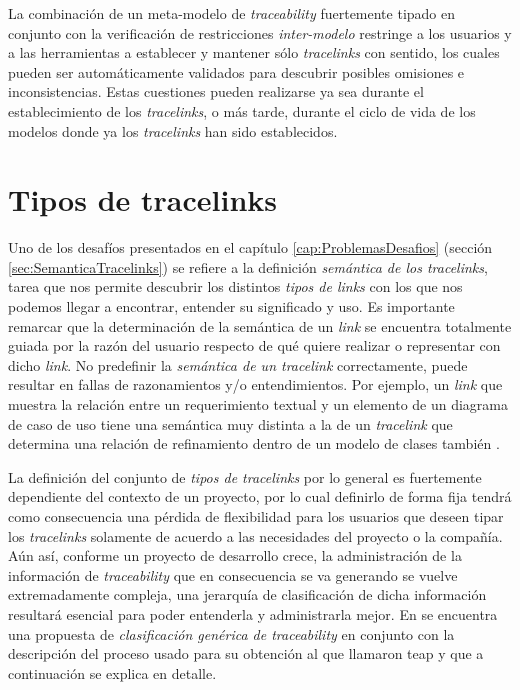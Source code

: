 \documentclass[a4paper,12pt,oneside,spanish]{book}
\begin{document}
La combinación de un meta-modelo de \textit{traceability} fuertemente tipado en conjunto con la verificación de restricciones \textit{inter-modelo} restringe a los usuarios y a las herramientas a establecer y mantener sólo \textit{tracelinks} con sentido, los cuales pueden ser automáticamente validados para descubrir posibles omisiones e inconsistencias. Estas cuestiones pueden realizarse ya sea durante el establecimiento de los \textit{tracelinks}, o más tarde, durante el ciclo de vida de los modelos donde ya los \textit{tracelinks} han sido establecidos.




\section{Tipos de tracelinks}

Uno de los desafíos presentados en el capítulo \ref{cap:ProblemasDesafios} (sección \ref{sec:SemanticaTracelinks}) se refiere a la definición  \textit{semántica de los tracelinks}, tarea que nos permite descubrir los distintos \textit{tipos de links} con los que nos podemos llegar a encontrar, entender su significado y uso. Es importante remarcar que la determinación de la semántica de un \textit{link} se encuentra totalmente guiada por la razón del usuario respecto de qué quiere realizar o representar con dicho \textit{link}. No predefinir la \textit{semántica de un tracelink} correctamente, puede resultar en fallas de razonamientos y/o entendimientos. Por ejemplo, un \textit{link} que muestra la relación entre un requerimiento textual y un elemento de un diagrama de caso de uso  tiene una semántica muy distinta a la de un \textit{tracelink} que determina una relación de refinamiento dentro de un modelo de clases también .

La definición del conjunto de \textit{tipos de tracelinks} por lo general es fuertemente dependiente del contexto de un proyecto, por lo cual definirlo de forma fija tendrá como consecuencia una pérdida de flexibilidad para los usuarios que deseen tipar los \textit{tracelinks} solamente de acuerdo a las necesidades del proyecto o la compañía. Aún así, conforme un proyecto de desarrollo crece, la administración de la información de \textit{traceability} que en consecuencia se va generando se vuelve extremadamente compleja, una jerarquía de clasificación de dicha información resultará esencial para poder entenderla y administrarla mejor. En \cite{PaigeOlsenKolovosZschalerPower} se encuentra una propuesta de \textit{clasificación genérica de traceability} en conjunto con la descripción del proceso usado para su obtención al que llamaron \gls{teap} y que a continuación se explica en detalle.
\end{document}
